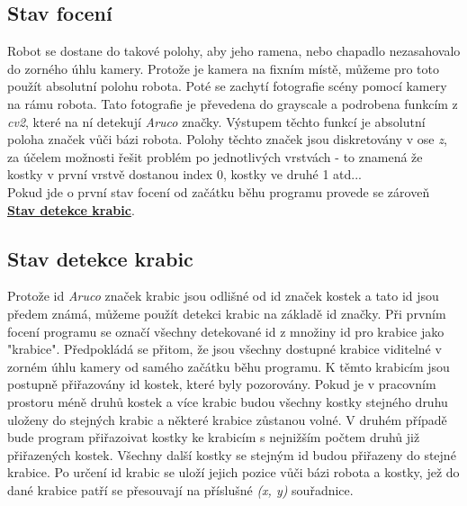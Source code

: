 \documentclass[journal,twoside,web]{ieeecolor}
\begin{document}
\hypertarget{capturing_state}{\subsection{Stav focení}}
Robot se dostane do takové polohy, aby jeho ramena, nebo chapadlo nezasahovalo do zorného úhlu kamery. Protože
je kamera na fixním místě, můžeme pro toto použít absolutní polohu robota. Poté se zachytí fotografie scény pomocí
kamery na rámu robota. Tato fotografie je převedena do grayscale a podrobena funkcím z \textit{cv2}, které na ní detekují \textit{Aruco}
značky. Výstupem těchto funkcí je absolutní poloha značek vůči bázi robota. Polohy těchto značek jsou
diskretovány v ose \textit{z}, za účelem možnosti řešit problém po jednotlivých vrstvách - to znamená že kostky v první vrstvě dostanou
index 0, kostky ve druhé 1 atd...\\
Pokud jde o první stav focení od začátku běhu programu provede se zároveň \hyperlink{stav_detekce_krabic}{\textbf{Stav detekce krabic}}.

\hypertarget{stav_detekce_krabic}{\subsection{Stav detekce krabic}}
Protože id \textit{Aruco} značek krabic jsou odlišné od id značek kostek a tato id jsou předem známá, můžeme použít detekci krabic na
základě id značky. Při prvním focení programu se označí všechny detekované id z množiny id pro krabice jako "krabice". Předpokládá se přitom, že
jsou všechny dostupné krabice viditelné v zorném úhlu kamery od samého začátku běhu programu. K těmto krabicím jsou postupně přiřazovány id kostek,
které byly pozorovány. Pokud je v pracovním prostoru méně druhů kostek a více krabic budou všechny kostky stejného druhu uloženy do stejných krabic
a některé krabice zůstanou volné.
V druhém případě bude program přiřazoivat kostky ke krabicím s nejnižším počtem druhů již přiřazených kostek.
Všechny další kostky se stejným id budou přiřazeny do stejné krabice. %
Po určení id krabic se uloží jejich pozice vůči bázi robota a kostky, jež do dané krabice patří se přesouvají na příslušné \textit{(x, y)} souřadnice.
\end{document}
